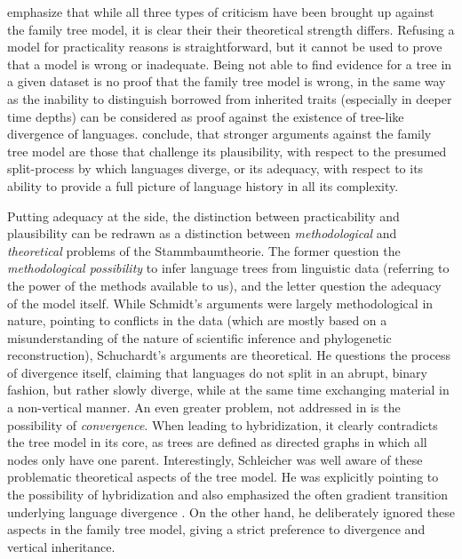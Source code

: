 \documentclass[svgnames,12pt]{scrartcl}
\begin{document}
{\citet{Geisler2013} emphasize that while all three types of criticism have been brought up against
the family tree model, it is clear their their theoretical strength differs. Refusing a model for
practicality reasons is straightforward, but it cannot be used to prove that a model is wrong or
inadequate.  Being not able to find evidence for a tree in a given dataset is no proof that the
family tree model is wrong, in the same way as the inability to distinguish borrowed from inherited
traits (especially in deeper time depths) can be considered as proof against the existence of
tree-like divergence of languages.  \citet{Geisler2013} conclude, that stronger arguments against
the family tree model are those that challenge its plausibility, with respect to the presumed
split-process by which languages diverge, or its adequacy, with respect to its ability to provide a
full picture of language history in all its complexity.
 
Putting adequacy at the side, the distinction between practicability and plausibility can be redrawn
as a distinction between \emph{methodological} and \emph{theoretical} problems of the
Stammbaumtheorie. The former question the \emph{methodological possibility} to infer language trees from linguistic data
(referring to the power of the methods available to us),
and the letter question the adequacy of the model itself. While Schmidt's arguments were largely
methodological in nature, pointing to conflicts in the data (which are mostly based on a
misunderstanding of the nature of scientific inference and phylogenetic reconstruction),
Schuchardt's arguments are theoretical. He questions the process of divergence itself, claiming that
languages do not split in an abrupt, binary fashion, but rather slowly diverge, while at the same
time exchanging material in a non-vertical manner. An even greater problem, not addressed in
\citet{Schuchardt1870} is the possibility of \emph{convergence}. When leading to hybridization, it clearly
contradicts the tree model in its core, as trees are defined as directed graphs in which all nodes
only have one parent.
Interestingly, Schleicher was well aware of these problematic theoretical aspects of the tree
model. He was explicitly pointing to the possibility of hybridization 
\citep{Schleicher1848} and also emphasized the often gradient
transition underlying language divergence \citep[21]{Schleicher1863}.
On the other hand, he deliberately ignored these aspects in the family
tree model, giving a strict preference to divergence and vertical inheritance. 
 
}
\end{document}
